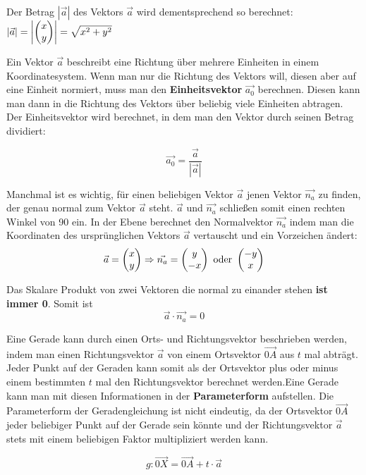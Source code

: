 Der Betrag $|\vec{a}|$ des Vektors $\vec{a}$ wird dementsprechend so  berechnet: $ |\vec{a}| = \left|\begin{pmatrix}x \\ y\end{pmatrix}\right| = \sqrt{x^2 + y^2}$


Ein Vektor $\vec{a}$ beschreibt eine Richtung \"{u}ber mehrere Einheiten in einem Koordinatesystem. Wenn man nur die Richtung des Vektors will, diesen aber auf eine Einheit normiert, muss man den \textbf{Einheitsvektor} $\vec{a_{0}}$ berechnen. Diesen kann man dann in die Richtung des Vektors \"{u}ber beliebig viele Einheiten abtragen. Der Einheitsvektor wird berechnet, in dem man den Vektor durch seinen Betrag dividiert:

$$\vec{a_{0}} = \frac{\vec{a}}{|\vec{a}|}$$


Manchmal ist es wichtig, f\"{u}r einen beliebigen Vektor $\vec{a}$ jenen Vektor $\vec{n_{a}}$ zu finden, der genau normal zum Vektor $\vec{a}$ steht. $\vec{a}$ und $\vec{n_{a}}$ schlie\ss{}en somit einen rechten Winkel von 90\degree{} ein. In der Ebene berechnet den Normalvektor $\vec{n_{a}}$ indem man die Koordinaten des urspr\"{u}nglichen Vektors $\vec{a}$ vertauscht und ein Vorzeichen \"{a}ndert:
$$ \vec{a} = \begin{pmatrix}x\\y\end{pmatrix} \Rightarrow \vec{n_{a}} = \begin{pmatrix}y \\ -x\end{pmatrix} \text{ oder } \begin{pmatrix}-y \\ x\end{pmatrix}$$

Das Skalare Produkt von zwei Vektoren die normal zu einander stehen \textbf{ist immer 0}. Somit ist $$\vec{a} \cdot \vec{n_{a}} = 0$$

\pagebreak



Eine Gerade kann durch einen Orts- und Richtungsvektor beschrieben werden, indem man einen Richtungsvektor $\vec{a}$ von einem Ortsvektor $\vec{0A}$ aus $t$ mal abtr\"{a}gt. Jeder Punkt auf der Geraden kann somit als der Ortsvektor plus oder minus einem bestimmten $t$ mal den Richtungsvektor berechnet werden.Eine Gerade kann man mit diesen Informationen in der \textbf{Parameterform} aufstellen. Die Parameterform der Geradengleichung ist nicht eindeutig, da der Ortsvektor $\vec{0A}$ jeder beliebiger Punkt auf der Gerade sein k\"{o}nnte und der Richtungsvektor $\vec{a}$ stets mit einem beliebigen Faktor multipliziert werden kann.

$$g: \vec{0X} = \vec{0A} + t \cdot \vec{a}$$

